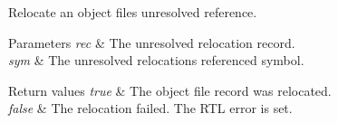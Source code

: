 Relocate an object file\textquotesingle{}s unresolved reference.


\begin{DoxyParams}{Parameters}
{\em rec} & The unresolved relocation record. \\
\hline
{\em sym} & The unresolved relocation\textquotesingle{}s referenced symbol. \\
\hline
\end{DoxyParams}

\begin{DoxyRetVals}{Return values}
{\em true} & The object file record was relocated. \\
\hline
{\em false} & The relocation failed. The R\+TL error is set. \\
\hline
\end{DoxyRetVals}
